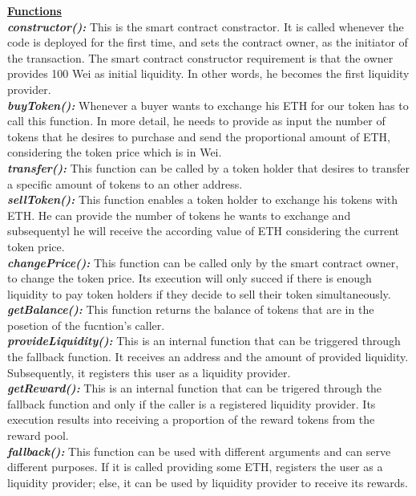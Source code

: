 \documentclass[12pt,a4paper]{article}
\begin{document}
\textbf{\underline{Functions}} \\
\textbf{\emph{constructor():}} This is the smart contract constractor. It is
called whenever the code is deployed for the first time, and sets the contract
owner, as the initiator of the transaction. The smart contract constructor
requirement is that the owner provides 100 Wei as initial liquidity. In
other words, he becomes the first liquidity provider.\\
\textbf{\emph{buyToken():}} Whenever a buyer wants to exchange his ETH for our token has
to call this function. In more detail, he needs to provide as input the number
of tokens that he desires to purchase and send the proportional amount of ETH,
considering the token price which is in Wei.\\
\textbf{\emph{transfer():}} This function can be called by a token holder that desires to
transfer a specific amount of tokens to an other address.\\
\textbf{\emph{sellToken():}} This function enables a token holder to exchange his tokens
with ETH. He can provide the number of tokens he wants to exchange and
subsequentyl he will receive the according value of ETH considering the current
token price.\\
\textbf{\emph{changePrice():}} This function can be called only by the smart contract
owner, to change the token price. Its execution will only succed if there is
enough liquidity to pay token holders if they decide to sell their token
simultaneously.\\
\textbf{\emph{getBalance():}} This function returns the balance of tokens that are in the
posetion of the fucntion's caller.\\
\textbf{\emph{provideLiquidity():}} This is an internal function that can be triggered
through the fallback function. It receives an address and the amount of provided
liquidity. Subsequently, it registers this user as a liquidity provider. \\
\textbf{\emph{getReward():}} This is an internal function that can be trigered through
the fallback function and only if the caller is a registered liquidity provider.
Its execution results into receiving a proportion of the reward tokens from the
reward pool.\\
\textbf{\emph{fallback():}} This function can be used with different arguments and can
serve different purposes. If it is called providing some ETH, registers the user as a
liquidity provider; else, it can be used by liquidity provider to receive its
rewards.
\end{document}
